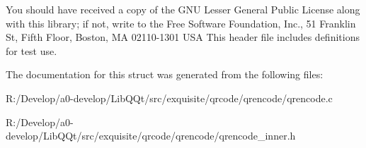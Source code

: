 You should have received a copy of the G\+NU Lesser General Public License along with this library; if not, write to the Free Software Foundation, Inc., 51 Franklin St, Fifth Floor, Boston, MA 02110-\/1301 U\+SA This header file includes definitions for test use. 

The documentation for this struct was generated from the following files\+:\begin{DoxyCompactItemize}
\item 
R\+:/\+Develop/a0-\/develop/\+Lib\+Q\+Qt/src/exquisite/qrcode/qrencode/qrencode.\+c\item 
R\+:/\+Develop/a0-\/develop/\+Lib\+Q\+Qt/src/exquisite/qrcode/qrencode/qrencode\+\_\+inner.\+h\end{DoxyCompactItemize}
